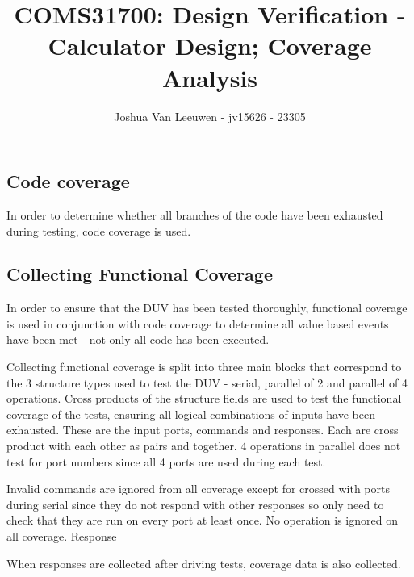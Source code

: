 \documentclass[a4paper]{article}
\title{\vspace{-0.7em}COMS31700: Design Verification - Calculator Design; Coverage Analysis\vspace{-0.7em}}
\author{Joshua Van Leeuwen - jv15626 - 23305}
\date{}
\begin{document}
\vspace{-10em}
\maketitle

\vspace{-5.1em}
\subsection*{Code coverage}
In order to determine whether all branches of the code have been exhausted during testing, code coverage is used.



\subsection*{Collecting Functional Coverage}
In order to ensure that the DUV has been tested thoroughly, functional coverage
is used in conjunction with code coverage to determine all value based events
have been met - not only all code has been executed.

Collecting functional coverage is split into three main blocks that correspond
to the 3 structure types used to test the DUV - serial, parallel of 2 and
parallel of 4 operations. Cross products of the structure fields are used to
test the functional coverage of the tests, ensuring all logical combinations of
inputs have been exhausted. These are the input ports, commands and responses.
Each are cross product with each other as pairs and together. 4 operations in
parallel does not test for port numbers since all 4 ports are used during each
test.

Invalid commands are ignored from all coverage except for crossed with ports
during serial since they do not respond with other responses so only need to
check that they are run on every port at least once. No operation is ignored on
all coverage. Response

When responses are collected after driving tests, coverage data is also
collected.
\end{document}
